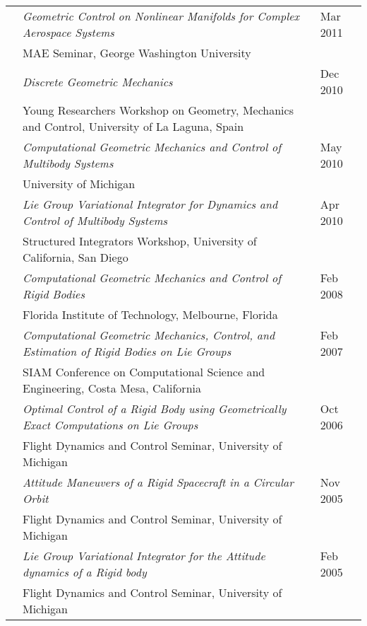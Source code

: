 \documentclass[10pt]{article}
\begin{document}
\begin{tabularx}{\textwidth}{>{\setlength{\hsize}{0.5cm}}X%
>{\setlength{\hsize}{14.3cm}}X%
>{\hfill}X}
& \textit{Geometric Control on Nonlinear Manifolds
for Complex Aerospace Systems
} & Mar 2011\\
& {MAE Seminar}, George Washington University\vspace*{0.1cm}\\

& \textit{Discrete Geometric Mechanics} & Dec 2010\\
& {Young Researchers Workshop on Geometry, Mechanics and Control}, University of La Laguna, Spain\vspace*{0.1cm}\\
& \textit{Computational Geometric Mechanics and Control of Multibody Systems} & May 2010\\
& {University of Michigan}\vspace*{0.1cm}\\
& \textit{Lie Group Variational Integrator for Dynamics and Control of Multibody Systems} & Apr 2010\\
& {Structured Integrators Workshop}, University of California, San Diego\vspace*{0.1cm}\\
& \textit{Computational Geometric Mechanics and Control of Rigid Bodies} & Feb 2008\\
& {Florida Institute of Technology}, Melbourne, Florida\vspace*{0.1cm}\\
& \textit{Computational Geometric Mechanics, Control, and Estimation of Rigid Bodies on Lie Groups} & Feb 2007\\
& {SIAM Conference on Computational Science and Engineering}, Costa Mesa, California\vspace*{0.1cm}\\
& \textit{Optimal Control of a Rigid Body using Geometrically Exact Computations on Lie Groups} & Oct 2006\\
& {Flight Dynamics and Control Seminar}, University of Michigan\vspace*{0.1cm}\\
& \textit{Attitude Maneuvers of a Rigid Spacecraft in a Circular Orbit} & Nov 2005\\
& {Flight Dynamics and Control Seminar}, University of Michigan\vspace*{0.1cm}\\
& \textit{Lie Group Variational Integrator for the Attitude dynamics of a Rigid body} & Feb 2005\\
& {Flight Dynamics and Control Seminar}, University of Michigan
\end{tabularx}
\end{document}
